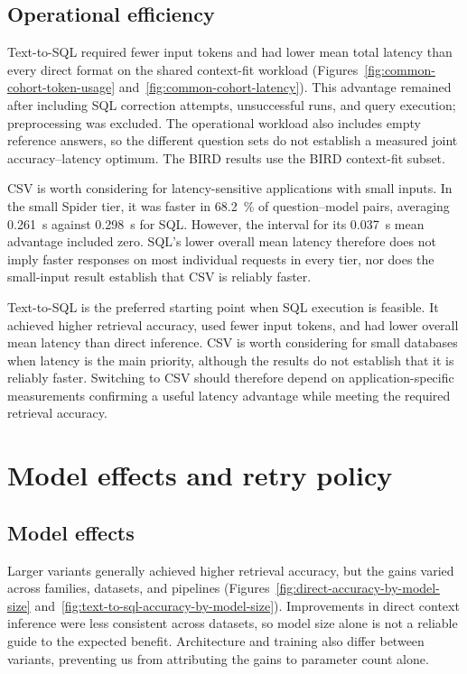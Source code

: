 \subsection{Operational efficiency}

Text-to-SQL required fewer input tokens and had lower mean total latency than every direct format on the
shared context-fit workload (Figures~\ref{fig:common-cohort-token-usage} and~\ref{fig:common-cohort-latency}).
This advantage remained after including SQL correction attempts, unsuccessful runs, and query execution;
preprocessing was excluded. The operational workload also includes empty reference answers, so the different
question sets do not establish a measured joint accuracy--latency optimum. The BIRD results use the BIRD
context-fit subset.

CSV is worth considering for latency-sensitive applications with small inputs. In the small Spider tier,
it was faster in \qty{68.2}{\percent} of question--model pairs, averaging \qty{0.261}{\second} against
\qty{0.298}{\second} for SQL. However, the interval for its \qty{0.037}{\second} mean advantage included
zero. SQL's lower overall mean latency therefore does not imply faster responses on most individual
requests in every tier, nor does the small-input result establish that CSV is reliably faster.

Text-to-SQL is the preferred starting point when SQL execution is feasible. It achieved higher retrieval accuracy,
used fewer input tokens, and had lower overall mean latency than direct inference.
CSV is worth considering for small databases when latency is the main priority, although the results do
not establish that it is reliably faster. Switching to CSV should therefore depend on application-specific
measurements confirming a useful latency advantage while meeting the required retrieval accuracy.

\section{Model effects and retry policy} \label{sec:main-findings-interpretation}

\subsection{Model effects}

Larger variants generally achieved higher retrieval accuracy, but the gains varied across families,
datasets, and pipelines (Figures~\ref{fig:direct-accuracy-by-model-size}
and~\ref{fig:text-to-sql-accuracy-by-model-size}). Improvements in direct context inference were less
consistent across datasets, so model size alone is not a reliable guide to the expected benefit. Architecture
and training also differ between variants, preventing us from attributing the gains to parameter count alone.

